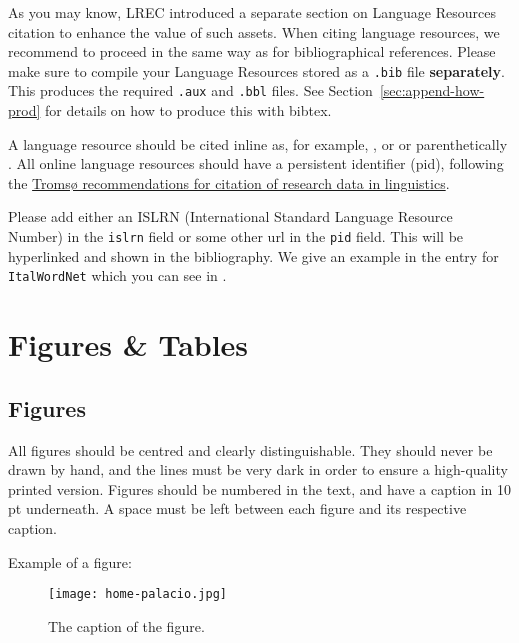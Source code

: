 \documentclass[10pt, a4paper]{article}
\begin{document}
As you may know, LREC introduced a separate section on Language
Resources citation to enhance the value of such assets. When citing
language resources, we recommend to proceed in the same way as for
bibliographical references. Please make sure to compile your Language
Resources stored as a \texttt{.bib} file \textbf{separately}. This
produces the required \texttt{.aux} and \texttt{.bbl} files.  See
Section~\ref{sec:append-how-prod} for details on how to produce this
with bibtex.

A language resource should be cited inline as, for example,
, or  or
parenthetically .  All online
language resources should have a persistent identifier (pid), following the \href{https://doi.org/10.15497/RDA00040}{Tromsø recommendations for citation of research data in linguistics}.

Please add either an ISLRN (International Standard Language Resource
Number) in the \texttt{islrn} field or some other url in the
\texttt{pid} field.  This will be hyperlinked and shown in the
bibliography.  We give an example in the entry for \texttt{ItalWordNet} which you can see in .
  



  
\section{Figures \& Tables}

\subsection{Figures}

All figures should be centred and clearly distinguishable. They should never be drawn by hand, and the lines must be very dark in order to ensure a high-quality printed version. Figures should be numbered in the text, and have a caption in 10 pt underneath. A space must be left between each figure and its respective caption. 

Example of a figure:

\begin{figure}[!ht]
\begin{center}
\texttt{[image: home-palacio.jpg]}
\caption{The caption of the figure.}
\label{fig.1}
\end{center}
\end{figure}
\end{document}
